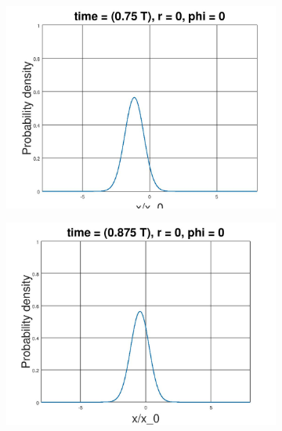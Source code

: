 \documentclass[12pt, twoside]{article}
\begin{document}
\begin{figure}[h!]
\begin{subfigure}[h!]{0.3\linewidth}
\end{subfigure}
\begin{subfigure}[h!]{0.3\linewidth}
	\includegraphics[width=\linewidth]{graphs/coherent/6.jpg}
\end{subfigure}
\begin{subfigure}[h!]{0.3\linewidth}
	\includegraphics[width=\linewidth]{graphs/coherent/7.jpg}
\end{subfigure}
\begin{subfigure}[h!]{0.3\linewidth}

\end{subfigure}
\end{figure}
\end{document}
